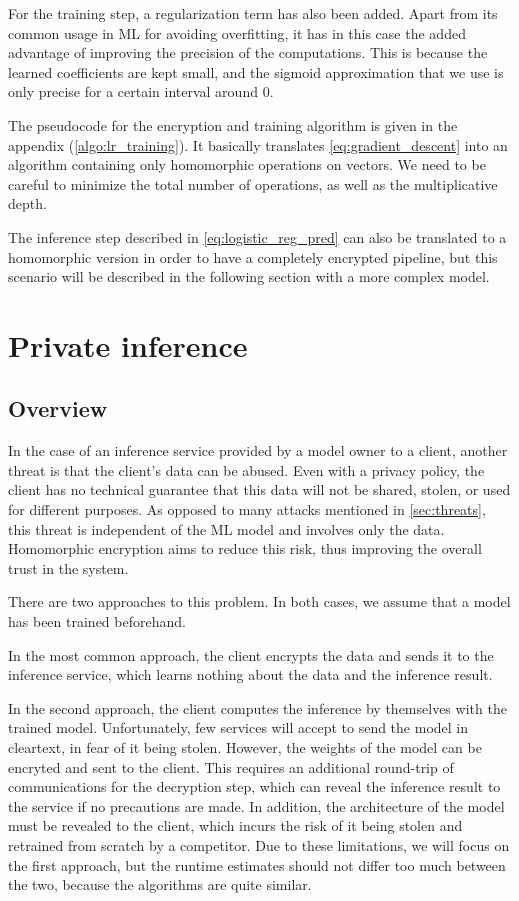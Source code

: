 \documentclass[a4paper,11pt,oneside]{report}
\begin{document}
For the training step, a regularization term has also been added. 
Apart from its common usage in ML for avoiding overfitting, it has in this case the added advantage of improving the precision of the computations. 
This is because the learned coefficients are kept small, and the sigmoid approximation that we use is only precise for a certain interval around $0$.

The pseudocode for the encryption and training algorithm is given in the appendix (\autoref{algo:lr_training}).
It basically translates \autoref{eq:gradient_descent} into an algorithm containing only homomorphic operations on vectors.
We need to be careful to minimize the total number of operations, as well as the multiplicative depth.

The inference step described in \autoref{eq:logistic_reg_pred} can also be translated to a homomorphic version in order to have a completely encrypted pipeline, but this scenario will be described in the following section with a more complex model.


\section{Private inference}\label{sec:private_inference}

\subsection{Overview}

In the case of an inference service provided by a model owner to a client, another threat is that the client's data can be abused. 
Even with a privacy policy, the client has no technical guarantee that this data will not be shared, stolen, or used for different purposes. 
As opposed to many attacks mentioned in \autoref{sec:threats}, this threat is independent of the ML model and involves only the data. 
Homomorphic encryption aims to reduce this risk, thus improving the overall trust in the system.

There are two approaches to this problem. 
In both cases, we assume that a model has been trained beforehand. 

In the most common approach, the client encrypts the data and sends it to the inference service, which learns nothing about the data and the inference result.

In the second approach, the client computes the inference by themselves with the trained model.
Unfortunately, few services will accept to send the model in cleartext, in fear of it being stolen.
However, the weights of the model can be encryted and sent to the client. 
This requires an additional round-trip of communications for the decryption step, which can reveal the inference result to the service if no precautions are made. 
In addition, the architecture of the model must be revealed to the client, which incurs the risk of it being stolen and retrained from scratch by a competitor. 
Due to these limitations, we will focus on the first approach, but the runtime estimates should not differ too much between the two, because the algorithms are quite similar.
\end{document}
